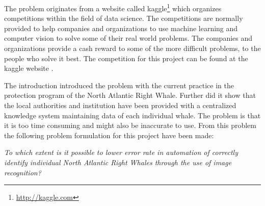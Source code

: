 The problem originates from a website called kaggle\footnote{\url{http://kaggle.com}} which organizes competitions within the field of data science. The competitions are normally provided to help companies and organizations to use machine learning and computer vision to solve some of their real world problems. The companies and organizations provide a cash reward to some of the more difficult problems, to the people who solve it best. The competition for this project can be found at the kaggle website \cite{kaggle:competition}.

The introduction introduced the problem with the current practice in the protection program of the North Atlantic Right Whale. Further did it show that the local authorities and institution have been provided with a centralized knowledge system maintaining data of each individual whale.
The problem is that it is too time consuming and might also be inaccurate to use.
From this problem the following problem formulation for this project have been made:

\begin{center}
	\emph{To which extent is it possible to lower error rate in automation of correctly identify individual North Atlantic Right Whales through the use of image recognition?}
\end{center}